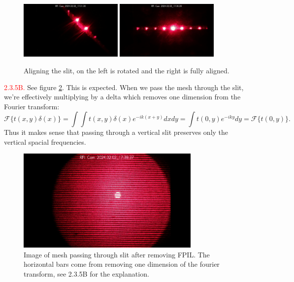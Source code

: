 \documentclass[letterpaper, reqno,11pt]{article}
\begin{document}
\begin{figure}[tb]
    \centering
    \includegraphics[width=0.45\textwidth]{Fourier/5a/media/im_0201_20240202_173130.jpg}
    \includegraphics[width=0.45\textwidth]{Fourier/5a/media/im_0196_20240202_173028.jpg}
    \caption{Aligning the slit, on the left is rotated and the right is fully aligned.}
    \label{fig:2-3-5A}
\end{figure}

\noindent \textcolor{red}{2.3.5B.} See figure \ref{fig:2-3-5B}. This is expected. When we pass the mesh through the slit, we're effectively multiplying by a delta which removes one dimension from the Fourier transform:
\[
    \mathcal F\{t(x,y)\delta(x)\}=\int\int t(x,y)\delta(x)e^{-ik(x+y)}dxdy=\int t(0,y) e^{-iky}dy=\mathcal F\{t(0,y)\}
.\]
Thus it makes sense that passing through a vertical slit preserves only the vertical spacial frequencies.

\begin{figure}[tb]
    \centering
    \includegraphics[width=0.8\textwidth]{Fourier/5b/media/im_0203_20240202_173838.jpg}
    \caption{Image of mesh passing through slit after removing FPIL. The horizontal bars come from removing one dimension of the fourier transform, see 2.3.5B for the explanation.}
    \label{fig:2-3-5B}
\end{figure}
\end{document}
